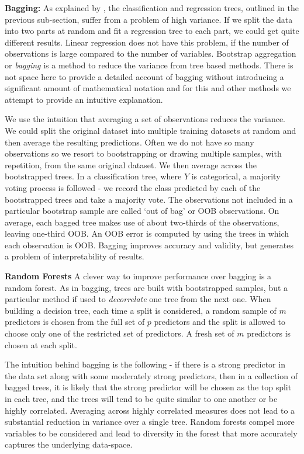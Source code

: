 \documentclass[alpha-refs,fleqn]{wiley-article_p2}
\begin{document}
\textbf{Bagging:} As explained by \cite{James_2013}, the classification and regression trees, outlined in the previous sub-section, suffer from a problem of high variance. If we split the data into two parts at random and fit a regression tree to each part, we could get quite different results. Linear regression does not have this problem, if the number of observations is large compared to the number of variables. Bootstrap aggregation or {\em{bagging}} is a method to reduce the variance from tree based methods. There is not space here to provide a detailed account of bagging without introducing a significant amount of mathematical notation and for this and other methods we attempt to provide an intuitive explanation. 

We use the intuition that averaging a set of observations reduces the variance. We could split the original dataset into multiple training datasets at random and  then average the resulting predictions. Often we do not have so many observations so we resort to bootstrapping or drawing multiple samples, with repetition, from the same original dataset. We then average across the bootstrapped trees. In a classification tree, where $Y$ is categorical, a majority voting process is followed - we record the class predicted by each of the bootstrapped trees and take a majority vote. The observations not included in a particular bootstrap sample are called `out of bag' or OOB observations. On average, each bagged tree makes use of about two-thirds of the observations, leaving one-third OOB. An OOB error is computed by using the trees in which each observation is OOB. Bagging improves accuracy and validity, but generates a problem of interpretability of results.

\textbf{Random Forests} A clever way to improve performance over bagging is a random forest. As in bagging, trees are built with bootstrapped samples, but a particular method if used to {\em{decorrelate}} one tree from the next one. When building a decision tree, each time a split is considered, a random sample of $m$ predictors is chosen from the full set of $p$ predictors and the split is allowed to choose only one of the restricted set of predictors. A fresh set of $m$ predictors is chosen at each split. 

The intuition behind bagging is the following - if there is a strong predictor in the data set along with some moderately strong predictors, then in a collection of bagged trees, it is likely that the strong predictor will be chosen as the top split in each tree, and the trees will tend to be quite similar to one another or be highly correlated. Averaging across highly correlated measures does not lead to a substantial reduction in variance over a single tree. Random forests compel more variables to be considered and lead to diversity in the forest that more accurately captures the underlying data-space. 
\end{document}
